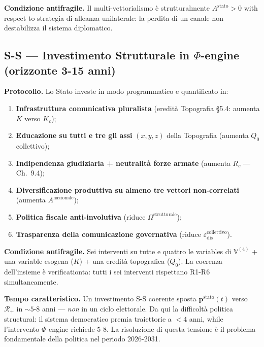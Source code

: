 \Proved{} \textbf{Condizione antifragile.} Il multi-vettorialismo è
strutturalmente \(A^{\text{stato}} > 0\) with respect to strategia di
alleanza unilaterale: la perdita di un canale non destabilizza il
sistema diplomatico.

\subsection{\texorpdfstring{S-S --- Investimento Strutturale in
\(\Phi\)-engine (orizzonte 3-15
anni)}{S-S --- Investimento Strutturale in \textbackslash Phi-engine (orizzonte 3-15 anni)}}\label{s-s-investimento-structural-in-phi-engine-orizzonte-3-15-anni}

\Hypoth{} \textbf{Protocollo.} Lo Stato investe in modo programmatico e
quantificato in:

\begin{enumerate}
\def\labelenumi{\arabic{enumi}.}
\tightlist
\item
  \textbf{Infrastruttura comunicativa pluralista} (eredità Topografia
  \S{}5.4: aumenta \(K\) verso \(K_c\));
\item
  \textbf{Educazione su tutti e tre gli assi} \((x, y, z)\) della
  Topografia (aumenta \(Q_0\) collettivo);
\item
  \textbf{Indipendenza giudiziaria + neutralità forze armate} (aumenta
  \(R_c\) --- Ch.~9.4);
\item
  \textbf{Diversificazione produttiva su almeno tre vettori
  non-correlati} (aumenta \(A^{\text{nazionale}}\));
\item
  \textbf{Politica fiscale anti-involutiva} (riduce
  \(\Omega^{\text{strutturale}}\));
\item
  \textbf{Trasparenza della comunicazione governativa} (riduce
  \(\varepsilon_{\text{dis}}^{\text{collettivo}}\)).
\end{enumerate}

\Proved{} \textbf{Condizione antifragile.} Sei interventi su tutte e
quattro le variables di \(\mathbb{V}^{(4)}\) + una variable esogena
(\(K\)) + una eredità topografica (\(Q_0\)). La coerenza dell'insieme è
verificationta: tutti i sei interventi rispettano R1-R6 simultaneamente.

\Hypoth{} \textbf{Tempo caratteristico.} Un investimento S-S coerente
sposta \(\boldsymbol{p}^{\text{stato}}(t)\) verso \(\mathcal{R}_+\) in
\(\sim 5\)-\(8\) anni --- \emph{non} in un ciclo elettorale. Da qui la
difficoltà politica structural: il sistema democratico premia
traiettorie a \(< 4\) anni, while l'intervento \(\Phi\)-engine richiede
\(5\)-\(8\). La risoluzione di questa tensione è il problema
fondamentale della politica nel periodo 2026-2031.



